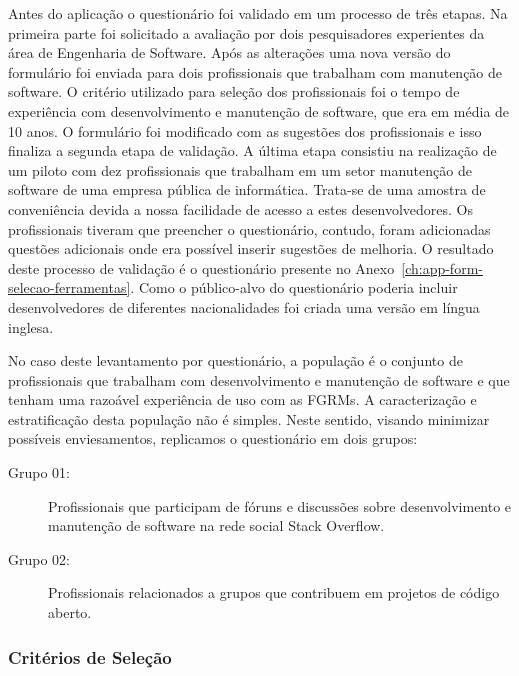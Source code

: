 Antes do aplicação o questionário foi validado em um processo de três etapas. Na
primeira parte foi solicitado a avaliação por dois pesquisadores experientes da
área de Engenharia de Software. Após as alterações uma nova versão do formulário
foi enviada para dois profissionais que trabalham com manutenção de software. O
critério utilizado para seleção dos profissionais foi o tempo de experiência com
desenvolvimento e manutenção de software, que era em média de 10 anos. O
formulário foi modificado com as sugestões dos profissionais e isso finaliza a
segunda etapa de validação. A última etapa consistiu na realização de um piloto
com dez profissionais que trabalham em um setor manutenção de software de uma
empresa pública de informática. Trata-se de uma amostra de conveniência devida a
nossa facilidade de acesso a estes desenvolvedores. Os profissionais tiveram que
preencher o questionário, contudo, foram adicionadas questões adicionais onde
era possível inserir sugestões de melhoria. O resultado deste processo de
validação é o questionário presente no
Anexo~\ref{ch:app-form-selecao-ferramentas}. Como o público-alvo do questionário
poderia incluir desenvolvedores de diferentes nacionalidades foi criada uma
versão em língua inglesa.

No caso deste levantamento por questionário, a população é o conjunto de
profissionais que trabalham com desenvolvimento e manutenção de software e que
tenham uma razoável experiência de uso com as FGRMs. A caracterização e
estratificação desta população não é simples. Neste sentido, visando minimizar
possíveis enviesamentos, replicamos o questionário em dois grupos:

\begin{description}
	\item[Grupo 01:] Profissionais que participam de fóruns e discussões sobre
		desenvolvimento e manutenção de software na rede social Stack Overflow.
	\item[Grupo 02:] Profissionais relacionados a grupos que contribuem em
		projetos de código aberto.
\end{description}


\subsubsection{Critérios de Seleção}
\label{ssub:metodologia_criterios_selecao}

